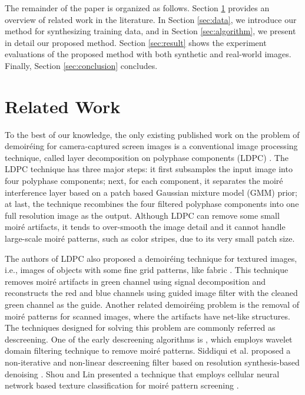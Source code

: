 \documentclass[10pt,twocolumn,letterpaper]{article}
\begin{document}
The remainder of the paper is organized as follows.  Section
\ref{sec:related} provides an overview of related work in the
literature.  In Section \ref{sec:data}, we introduce our method for
synthesizing training data, and in Section \ref{sec:algorithm}, we
present in detail our proposed method.  Section \ref{sec:result} shows
the experiment evaluations of the proposed method with both synthetic
and real-world images.  Finally, Section \ref{sec:conclusion}
concludes.


\section{Related Work}
\label{sec:related}

To the best of our knowledge, the only existing published work on the
problem of demoir\'eing for camera-captured screen images is a
conventional image processing technique, called layer decomposition on
polyphase components (LDPC) \cite{yang2017demoireing}.  The LDPC
technique has three major steps: it first subsamples the input image
into four polyphase components; next, for each component, it separates
the moir\'e interference layer based on a patch based Gaussian mixture
model (GMM) prior; at last, the technique recombines the four filtered
polyphase components into one full resolution image as the output.
Although LDPC can remove some small moir\'e artifacts, it tends to
over-smooth the image detail and it cannot handle large-scale moir\'e
patterns, such as color stripes, due to its very small patch size.

The authors of LDPC also proposed a demoir\'eing technique for
textured images, i.e., images of objects with some fine grid patterns,
like fabric \cite{yang2017textured}.  This technique removes moir\'e
artifacts in green channel using signal decomposition and reconstructs
the red and blue channels using guided image filter with the cleaned
green channel as the guide.  Another related demoir\'eing problem is
the removal of moir\'e patterns for scanned images, where the artifacts
have net-like structures.  The techniques designed for solving this
problem are commonly referred as descreening.  One of the early
descreening algorithms is \cite{luo1998robust}, which employs wavelet
domain filtering technique to remove moir\'e patterns.  Siddiqui et
al. proposed a non-iterative and non-linear descreening filter based
on resolution synthesis-based denoising \cite{siddiqui2007training}.
Shou and Lin presented a technique that employs cellular neural
network based texture classification for moir\'e pattern screening
\cite{shou2004image}.
\end{document}
